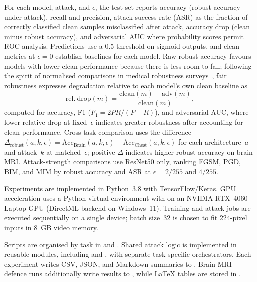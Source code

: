 \documentclass[12pt,a4paper,oneside]{report}
\begin{document}

For each model, attack, and $\epsilon$, the test set reports accuracy (robust accuracy under attack), recall and precision, attack success rate (ASR) as the fraction of correctly classified clean samples misclassified after attack, accuracy drop (clean minus robust accuracy), and adversarial AUC where probability scores permit ROC analysis. Predictions use a 0.5 threshold on sigmoid outputs, and clean metrics at $\epsilon = 0$ establish baselines for each model. Raw robust accuracy favours models with lower clean performance because there is less room to fall; following the spirit of normalised comparisons in medical robustness surveys~\cite{ma2021understanding}, fair robustness expresses degradation relative to each model's own clean baseline as
\[
  \mathrm{rel.\ drop}(m) = \frac{\mathrm{clean}(m) - \mathrm{adv}(m)}{\mathrm{clean}(m)},
\]
computed for accuracy, F1 ($F_1 = 2PR/(P+R)$), and adversarial AUC, where lower relative drop at fixed~$\epsilon$ indicates greater robustness after accounting for clean performance. Cross-task comparison uses the difference $\Delta_{\mathrm{robust}}(a,k,\epsilon) = \mathrm{Acc}_{\mathrm{Brain}}(a,k,\epsilon) - \mathrm{Acc}_{\mathrm{Chest}}(a,k,\epsilon)$ for each architecture~$a$ and attack~$k$ at matched~$\epsilon$; positive $\Delta$ indicates higher robust accuracy on brain MRI. Attack-strength comparisons use ResNet50 only, ranking FGSM, PGD, BIM, and MIM by robust accuracy and ASR at $\epsilon = 2/255$ and $4/255$.

Experiments are implemented in Python~3.8 with TensorFlow/Keras. GPU acceleration uses a Python virtual environment with  on an NVIDIA RTX~4060 Laptop GPU (DirectML backend on Windows~11). Training and attack jobs are executed sequentially on a single device; batch size~32 is chosen to fit 224-pixel inputs in 8~GB video memory.

Scripts are organised by task in  and . Shared attack logic is implemented in reusable modules, including  and , with separate task-specific orchestrators. Each experiment writes CSV, JSON, and Markdown summaries to . Brain MRI defence runs additionally write results to , while LaTeX tables are stored in .
\end{document}
